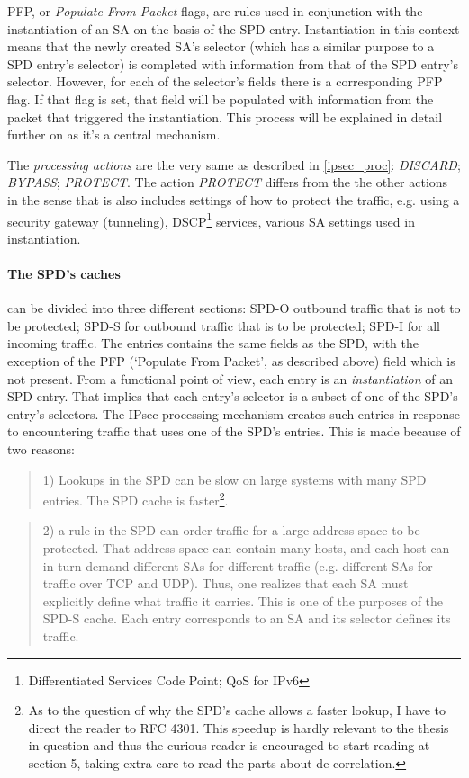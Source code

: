 \documentclass[final,a4paper,twoside,11pt,onecolumn]{report}
\begin{document}
PFP, or \emph{Populate From Packet} flags, are rules used in conjunction with the instantiation of an SA on the basis of the SPD entry. Instantiation in this context means that the newly created SA's selector (which has a similar purpose to a SPD entry's selector) is completed with information from that of the SPD entry's selector. However, for each of the selector's fields there is a corresponding PFP flag. If that flag is set, that field will be populated with information from the packet that triggered the instantiation. This process will be explained in detail further on as it's a central mechanism.

The \emph{processing actions} are the very same as described in \ref{ipsec_proc}: \emph{DISCARD}; \emph{BYPASS}; \emph{PROTECT}. The action \emph{PROTECT} differs from the the other actions in the sense that is also includes settings of how to protect the traffic, e.g. using a security gateway (tunneling), DSCP\footnote{Differentiated Services Code Point; QoS for IPv6} services, various SA settings used in instantiation.

\paragraph{The SPD's caches} can be divided into three different sections: SPD-O outbound traffic that is not to be protected; SPD-S for outbound traffic that is to be protected; SPD-I for all incoming traffic. The entries contains the same fields as the SPD, with the exception of the PFP (`Populate From Packet', as described above) field which is not present. From a functional point of view, each entry is an \emph{instantiation} of an SPD entry. That implies that each entry's selector is a subset of one of the SPD's entry's selectors. The IPsec processing mechanism creates such entries in response to encountering traffic that uses one of the SPD's entries. This is made because of two reasons: 

\begin{quotation}
1) Lookups in the SPD can be slow on large systems with many SPD entries. The SPD cache is faster\footnote{As to the question of why the SPD's cache allows a faster lookup, I have to direct the reader to RFC 4301. This speedup is hardly relevant to the thesis in question and thus the curious reader is encouraged to start reading at section 5, taking extra care to read the parts about de-correlation.}.
\end{quotation}

\begin{quotation}
2) a rule in the SPD can order traffic for a large address space to be protected. That address-space can contain many hosts, and each host can in turn demand different SAs for different traffic (e.g. different SAs for traffic over TCP and UDP). Thus, one realizes that each SA must explicitly define what traffic it carries. This is one of the purposes of the SPD-S cache. Each entry corresponds to an SA and its selector defines its traffic.
\end{quotation}
\end{document}
